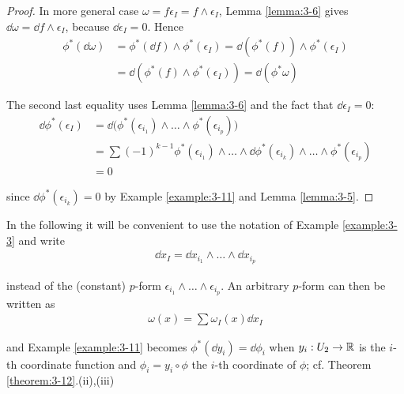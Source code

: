 \begin{proof}
In more general case $\omega = f\epsilon_I = f\wedge\epsilon_I$, Lemma \ref{lemma:3-6} gives  
$\dd\omega = \dd f\wedge\epsilon_I$, because $\dd\epsilon_I = 0$. Hence
\begin{align*}
  \phi^*(\!\dd\omega) 
  & = \phi^*(\!\dd f)\wedge\phi^*(\epsilon_I)
      = \dd(\phi^*(f))\wedge\phi^*(\epsilon_I) \\
  & = \dd(\phi^*(f)\wedge\phi^*(\epsilon_I))
    = \dd(\phi^*\omega)
\end{align*}

The second last equality uses Lemma \ref{lemma:3-6} and the fact that $\dd\epsilon_I = 0$:
\begin{align*}
  \dd\phi^{*}(\epsilon_{I})
  & = \dd\big(\phi^{*}(\epsilon_{i_{1}})\wedge\ldots\wedge\phi^{*}(\epsilon_{i_{p}})\big) \\
  & = \sum\left(-1\right)^{k-1}\phi^{*}(\epsilon_{i_{1}})\wedge\ldots\wedge\!\dd\phi^{*}(\epsilon_{i_{k}})\wedge\ldots\wedge\phi^{*}(\epsilon_{i_{p}})\\
  & = 0
\end{align*}  

since $\dd\phi^*(\epsilon_{i_k}) = 0$ by Example \ref{example:3-11} and Lemma \ref{lemma:3-5}.
\end{proof}


In the following it will be convenient to use the notation of Example \ref{example:3-3} and write
\begin{align*}
  \dd x_I = \dd x_{i_1}\wedge\ldots\wedge\!\dd x_{i_p}
\end{align*}

instead of the (constant) $p$-form $\epsilon_{i_1}\wedge\ldots\wedge\epsilon_{i_p}$. An arbitrary 
$p$-form can then be written as
\begin{align*}
  \omega(x) = \sum{\omega_I(x)\dd x_I}
\end{align*}

and Example \ref{example:3-11} becomes $\phi^*(\!\dd y_i) = \dd\phi_i$ when $y_i:U_2\to{\ensuremath{\mathbb{R}}}$ is 
the $i$-th coordinate function and $\phi_i = y_i\circ\phi$ the $i$-th coordinate of $\phi$; 
cf. Theorem \ref{theorem:3-12}.(ii),(iii)


